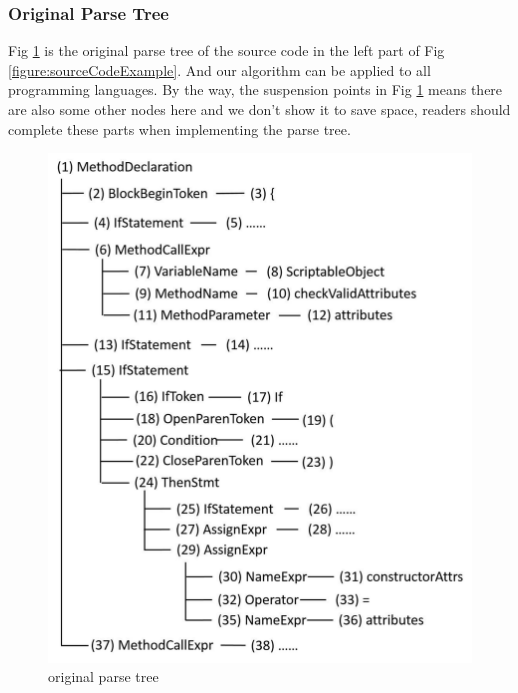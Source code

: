 \subsubsection{Original Parse Tree}
Fig \ref{figure:parseTree1} is the original parse tree of the source code in the left part of Fig \ref{figure:sourceCodeExample}. And our algorithm can be applied to all programming languages. By the way, the suspension points in Fig \ref{figure:parseTree1} means there are also some other nodes here and we don't show it to save space, readers should complete these parts when implementing the parse tree.
\begin{figure}[!htp]
 \centering
 \includegraphics[width=\linewidth]{img/parseTree1.pdf}
 \caption{\label{figure:parseTree1} original parse tree}
\end{figure}

